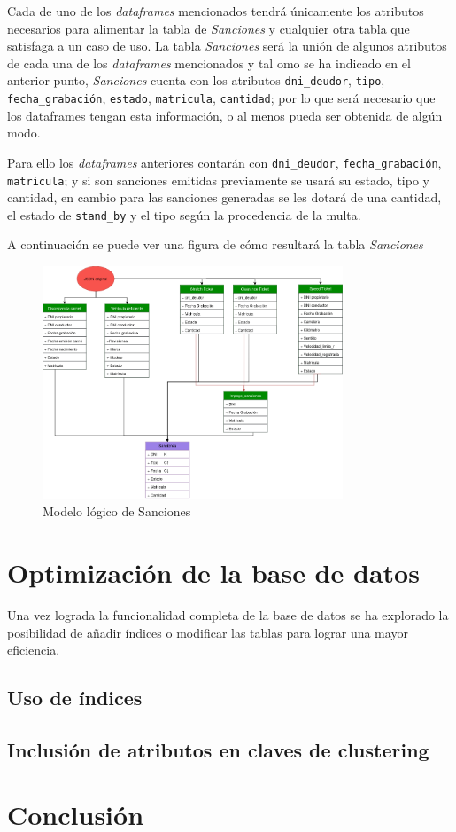\documentclass[]{article}
\begin{document}
Cada de uno de los \textit{dataframes} mencionados tendrá únicamente los atributos necesarios para alimentar la tabla de \textit{Sanciones} y cualquier otra tabla que satisfaga a un caso de uso.
La tabla \textit{Sanciones} será la unión de algunos atributos de cada una de los \textit{dataframes} mencionados y tal omo se ha indicado en el anterior punto, \textit{Sanciones} cuenta con los atributos \texttt{dni\_deudor}, \texttt{tipo}, \texttt{fecha\_grabación}, \texttt{estado}, \texttt{matricula}, \texttt{cantidad}; por lo que será necesario que los dataframes tengan esta información, o al menos pueda ser obtenida de algún modo.
\newline

Para ello los \textit{dataframes} anteriores contarán con \texttt{dni\_deudor}, \texttt{fecha\_grabación}, \texttt{matricula}; y si son sanciones emitidas previamente se usará su estado, tipo y cantidad, en cambio para las sanciones generadas se les dotará de una cantidad, el estado de \texttt{stand\_by} y el tipo según la procedencia de la multa.
\newline

A continuación se puede ver una figura de cómo resultará la tabla \textit{Sanciones}
\begin{figure}[H]
    \centering
    \includegraphics[width=0.8\textwidth]{./imagenes/Sanciones.png}
    \caption{Modelo lógico de Sanciones}
    \label{fig:modelo_sanciones}
\end{figure}

\section{Optimización de la base de datos}
\label{sec:optimusprime}
Una vez lograda la funcionalidad completa de la base de datos se ha explorado la posibilidad de añadir índices o modificar las tablas para lograr una mayor eficiencia.

\subsection{Uso de índices}

\subsection{Inclusión de atributos en claves de clustering}


\newpage
\section{Conclusión}
\label{sec:conclusion}
\end{document}

